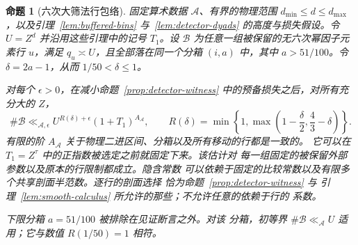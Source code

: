 \documentclass[11pt,a4paper]{article}
\numberwithin{equation}{section}
\numberwithin{figure}{section}
\newtheorem{proposition}[theorem]{命题}
\theoremstyle{definition}
\theoremstyle{remark}
\begin{document}
\begin{proposition}[六次大筛法行包络]\label{prop:sextic-row-count}
固定算术数据 $\mathcal A$、有界的物理范围
$d_{\min}\le d\le d_{\max}$，以及引理~\ref{lem:buffered-bins} 与~\ref{lem:detector-dyads} 的高度与损失假设。令
$U=Z^d$ 并沿用这些引理中的记号 $T_1$。设 $\mathcal B$
为任意一组被保留的无六次幂因子元素行 $u$，满足
$q_u\asymp U$，且全部落在同一个分箱 $(i,a)$ 中，其中 $a>51/100$。令
$\delta=2a-1$，从而 $1/50<\delta\le1$。

对每个 $\epsilon>0$，在减小命题~\ref{prop:detector-witness} 中的预备损失之后，对所有充分大的 $Z$，
\begin{equation}\label{eq:sextic-row-count}
 \#\mathcal B\ll_{\mathcal A,\epsilon}
 U^{R(\delta)+\epsilon}(1+T_1)^{A_{\mathcal A}},
 \qquad
 R(\delta)=\min\left\{1,
       \max\left(1-\frac\delta2,\frac43-\delta\right)\right\}.
\end{equation}
有限的阶 $A_{\mathcal A}$ 关于物理二进区间、分箱以及所有移动的行都是一致的。
它可以在 $T_1=Z^\tau$ 中的正指数被选定之前就固定下来。该估计对
每一组固定的被保留外部参数以及原本的行限制都成立。隐含常数
可以依赖于固定的比较常数以及有限多个共享剖面半范数。逐行的剖面选择
恰为命题~\ref{prop:detector-witness} 与
引理~\ref{lem:smooth-calculus} 所允许的那些；不允许任意的依赖于行的
系数。

下限分箱 $a=51/100$ 被排除在见证断言之外。对该
分箱，初等界 $\#\mathcal B\ll_{\mathcal A}U$ 适用；它与数值
$R(1/50)=1$ 相符。
\end{proposition}
\end{document}
